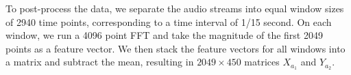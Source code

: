 To post-process the data, we separate the audio streams into equal window sizes of 2940
time points, corresponding to a time interval of 1/15 second. On each window, we run a
4096 point FFT and take the magnitude of the first 2049 points as a feature vector. We
then stack the feature vectors for all windows into a matrix and subtract the mean,
resulting in $2049 \times 450$ matrices $X_{a_1}$ and $Y_{a_2}$.


\begin{figure}
  \begin{center}
\end{center}
\end{figure}
